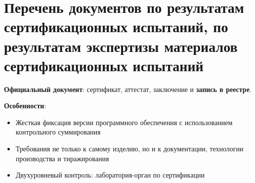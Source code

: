 \section{Перечень документов по результатам сертификационных испытаний, по результатам экспертизы материалов сертификационных испытаний}

\textbf{Официальный документ}: сертификат, аттестат, заключение и \textbf{запись в реестре}.

\textbf{Особенности}:
\begin{itemize}
	\item Жесткая фиксация версии программного обеспечения с использованием контрольного суммирования
	\item Требования не только к самому изделию, но и к документации, технологии производства и тиражирования
	\item Двухуровневый контроль: лаборатория-орган по сертификации
\end{itemize}